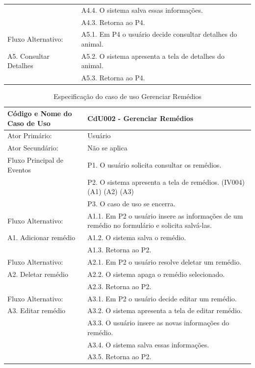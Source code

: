 \documentclass[12pt]{article}
\begin{document}
\begin{titlepage}
\begin{center}
\begin{table}[!h]
\begin{center}
\begin{tabular}{ | l |  p{10cm} |}
						   & A4.4. O sistema salva essas informações. \\
						   & A4.3. Retorna ao P4. \\ \hline
			Fluxo Alternativo:         & A5.1. Em P4 o usuário decide consultar detalhes do animal. \\
			A5. Consultar Detalhes     & A5.2. O sistema apresenta a tela de detalhes do animal. \\
						   & A5.3. Retorna ao P4. \\
			\hline
		\end{tabular}
	\end{center}
\end{table}

\newpage

\begin{table}[!h]
	\begin{center}
		\caption{Especificação do caso de uso Gerenciar Remédios}
		\begin{tabular}{ | l |  p{10cm} |}
			\hline
			Código e Nome do Caso de Uso & CdU002 - Gerenciar Remédios \\ \hline
			Ator Primário: & Usuário \\ 
			Ator Secundário: & Não se aplica \\ \hline
			Fluxo Principal de Eventos & P1. O usuário solicita consultar os remédios. \\
						   & P2. O sistema apresenta a tela de remédios. (IV004) (A1) (A2) (A3) \\
						   & P3. O caso de uso se encerra. \\ \hline
			Fluxo Alternativo:         & A1.1. Em P2 o usuário insere as informações de um remédio no formulário e solicita salvá-las. \\
			A1. Adicionar remédio      & A1.2. O sistema salva o remédio. \\ 
						   & A1.3. Retorna ao P2. \\ \hline
			Fluxo Alternativo:         & A2.1. Em P2 o usuário resolve deletar um remédio. \\
			A2. Deletar remédio        & A2.2. O sistema apaga o remédio selecionado. \\
						   & A2.3. Retorna ao P2. \\ \hline
			Fluxo Alternativo:         & A3.1. Em P2 o usuário decide editar um remédio. \\
			A3. Editar remédio         & A3.2. O sistema apresenta a tela de editar remédio. \\
						   & A3.3. O usuário insere as novas informações do remédio. \\
						   & A3.4. O sistema salva essas informações. \\
						   & A3.5. Retorna ao P2. \\
			\hline
		\end{tabular}
	\end{center}
\end{table}


\end{center}
\end{titlepage}
\end{document}
